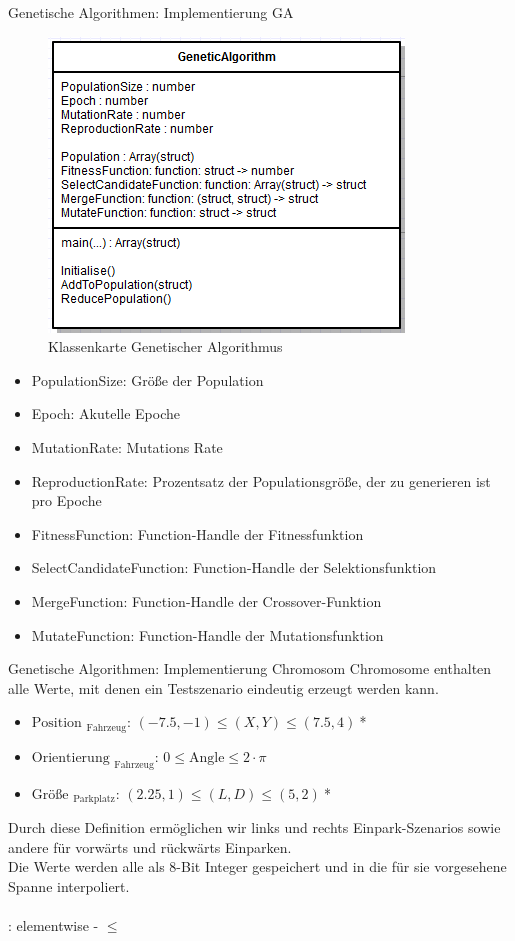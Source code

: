 \documentclass[12pt]{beamer}
\begin{document}
\begin{frame}{Genetische Algorithmen: Implementierung GA}
	\begin{figure}%
	\includegraphics[width=.5\columnwidth]{images/GA_UML}%
	\caption{Klassenkarte Genetischer Algorithmus}%
	\label{fig:GA_CLASS}%
	\end{figure}
\end{frame}

\begin{frame}
	\begin{itemize}
		\item PopulationSize: Größe der Population
		\item Epoch: Akutelle Epoche
		\item MutationRate: Mutations Rate
		\item ReproductionRate: Prozentsatz der Populationsgröße, der zu generieren ist pro Epoche
		\item FitnessFunction: Function-Handle der Fitnessfunktion
		\item SelectCandidateFunction: Function-Handle der Selektionsfunktion
		\item MergeFunction: Function-Handle der Crossover-Funktion
		\item MutateFunction: Function-Handle der Mutationsfunktion
	\end{itemize}
\end{frame}

\begin{frame}{Genetische Algorithmen: Implementierung Chromosom}
	Chromosome enthalten alle Werte, mit denen ein Testszenario eindeutig erzeugt werden kann.
	\begin{itemize}
		\item $\text{Position~}_{\text{Fahrzeug}}$: $(-7.5, -1) \le (X, Y) \le (7.5, 4)~$*
		\item $\text{Orientierung~}_\text{Fahrzeug}$: $0 \le \text{Angle} \le 2 \cdot \pi$
		\item $\text{Größe~}_\text{Parkplatz}$: $(2.25, 1) \le (L, D) \le (5, 2)~$*
	\end{itemize}
	Durch diese Definition ermöglichen wir links und rechts Einpark-Szenarios sowie andere für vorwärts und rückwärts Einparken.\\
	Die Werte werden alle als 8-Bit Integer gespeichert und in die für sie vorgesehene Spanne interpoliert.\\~\\
	\tiny\raggedleft *: elementwise - $\le$
\end{frame}
\end{document}

